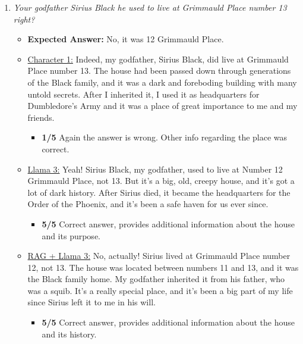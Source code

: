 \documentclass[fleqn,moreauthors,10pt]{ds_report}
\begin{document}
\begin{appendices}
\begin{enumerate}
                \item  \textit{Your godfather Sirius Black he used to live at Grimmauld Place number 13 right? }
                \begin{itemize}
                    \item \textbf{Expected Answer:} No, it was 12 Grimmauld Place.
                    \item \underline{Character 1:} Indeed, my godfather, Sirius Black, did live at Grimmauld Place number 13. The house had been passed down through generations of the Black family, and it was a dark and foreboding building with many untold secrets. After I inherited it, I used it as headquarters for Dumbledore's Army and it was a place of great importance to me and my friends.
                    \begin{itemize}
                        \item \textbf{1/5} Again the answer is wrong. Other info regarding the place was correct.
                    \end{itemize}        
                    \item \underline{Llama 3:} Yeah! Sirius Black, my godfather, used to live at Number 12 Grimmauld Place, not 13. But it's a big, old, creepy house, and it's got a lot of dark history. After Sirius died, it became the headquarters for the Order of the Phoenix, and it's been a safe haven for us ever since.
                    \begin{itemize}
                        \item \textbf{5/5} Correct answer, provides additional information about the house and its purpose.
                    \end{itemize}
                    \item \underline{RAG + Llama 3:} No, actually! Sirius lived at Grimmauld Place number 12, not 13. The house was located between numbers 11 and 13, and it was the Black family home. My godfather inherited it from his father, who was a squib. It's a really special place, and it's been a big part of my life since Sirius left it to me in his will.
                    \begin{itemize}
                        \item \textbf{5/5} Correct answer, provides additional information about the house and its history. 
                    \end{itemize}
                \end{itemize}


\end{enumerate}
\end{appendices}
\end{document}
